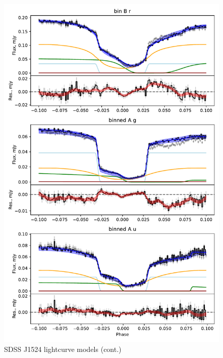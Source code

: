 \begin{figure}
    \centering
    \includegraphics[width=\textwidth]{figures/results/SDSS1524/SDSS1524_3.pdf}
    \caption{SDSS J1524 lightcurve models (cont.)}
    \label{fig:SDSS1524 all lightcurves cont 2}
\end{figure}
